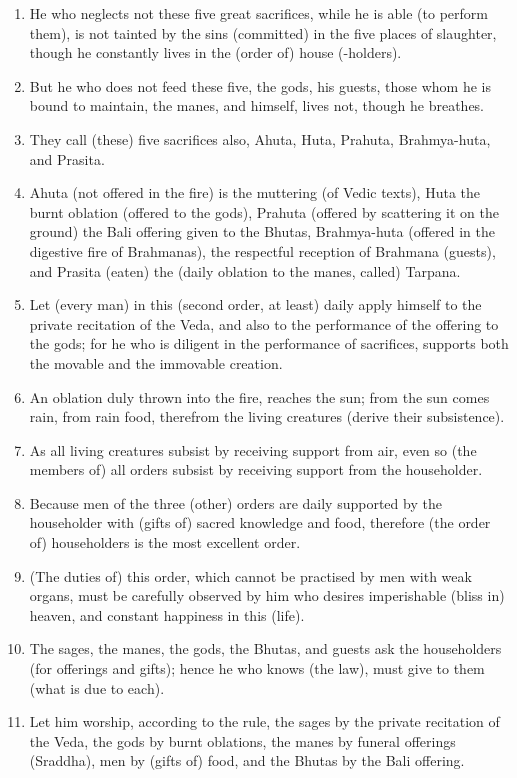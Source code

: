 \begin{enumerate}
\item He who neglects not these five great sacrifices, while he is able (to perform them), is not tainted by the sins (committed) in the five places of slaughter, though he constantly lives in the (order of) house (-holders).
\item But he who does not feed these five, the gods, his guests, those whom he is bound to maintain, the manes, and himself, lives not, though he breathes.
\item They call (these) five sacrifices also, Ahuta, Huta, Prahuta, Brahmya-huta, and Prasita.
\item Ahuta (not offered in the fire) is the muttering (of Vedic texts), Huta the burnt oblation (offered to the gods), Prahuta (offered by scattering it on the ground) the Bali offering given to the Bhutas, Brahmya-huta (offered in the digestive fire of Brahmanas), the respectful reception of Brahmana (guests), and Prasita (eaten) the (daily oblation to the manes, called) Tarpana.
\item Let (every man) in this (second order, at least) daily apply himself to the private recitation of the Veda, and also to the performance of the offering to the gods; for he who is diligent in the performance of sacrifices, supports both the movable and the immovable creation.
\item An oblation duly thrown into the fire, reaches the sun; from the sun comes rain, from rain food, therefrom the living creatures (derive their subsistence).
\item As all living creatures subsist by receiving support from air, even so (the members of) all orders subsist by receiving support from the householder.
\item Because men of the three (other) orders are daily supported by the householder with (gifts of) sacred knowledge and food, therefore (the order of) householders is the most excellent order.
\item (The duties of) this order, which cannot be practised by men with weak organs, must be carefully observed by him who desires imperishable (bliss in) heaven, and constant happiness in this (life).
\item The sages, the manes, the gods, the Bhutas, and guests ask the householders (for offerings and gifts); hence he who knows (the law), must give to them (what is due to each).
\item Let him worship, according to the rule, the sages by the private recitation of the Veda, the gods by burnt oblations, the manes by funeral offerings (Sraddha), men by (gifts of) food, and the Bhutas by the Bali offering.

\end{enumerate}
